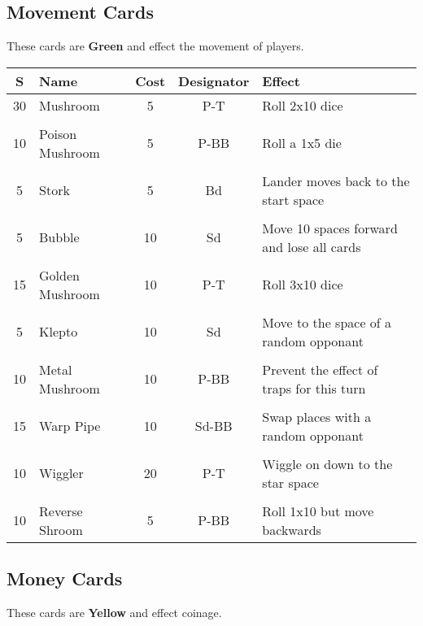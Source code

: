 \documentclass{article}
\begin{document}
\subsection{Movement Cards}

These cards are \textbf{Green} and effect the movement of players.
\vspace{2ex}

\begin{tabular}{clccp{5cm}}
\textbf{S} & \textbf{Name} & \textbf{Cost} & \textbf{Designator}
& \textbf{Effect} \\
\hline
30 & Mushroom & 5 & P-T & Roll 2x10 dice \\
&&&& \\
10 & Poison Mushroom & 5 & P-BB & Roll a 1x5 die \\
&&&& \\
5 & Stork & 5 & Bd & Lander moves back to the start space \\
&&&& \\
5 & Bubble & 10 & Sd & Move 10 spaces forward and lose all cards \\
&&&& \\
15 & Golden Mushroom & 10 & P-T & Roll 3x10 dice \\
&&&& \\
5 & Klepto & 10 & Sd & Move to the space of a random opponant \\
&&&& \\
10 & Metal Mushroom & 10 & P-BB & Prevent the effect of traps for this turn \\
&&&& \\
15 & Warp Pipe & 10 & Sd-BB & Swap places with a random opponant \\
&&&& \\
10 & Wiggler & 20 & P-T & Wiggle on down to the star space \\
&&&& \\
10 & Reverse Shroom & 5 & P-BB & Roll 1x10 but move backwards \\
\end{tabular}

\subsection{Money Cards}

These cards are \textbf{Yellow} and effect coinage.
\vspace*{2ex}
\end{document}
